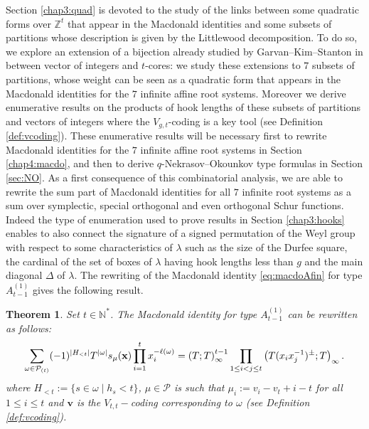 \documentclass[11pt,letterpaper]{amsart}
\def\bbbz{\mathbb Z}
\def\ccp{\mathcal P}
\newtheorem{thm}[df]{Theorem}
\numberwithin{equation}{section}
\numberwithin{df}{section}
\begin{document}
Section \ref{chap3:quad} is devoted to the study of the links between some quadratic forms over $\bbbz^t$ that appear in the Macdonald identities and some subsets of partitions whose description is given by the Littlewood decomposition. To do so, we explore an extension of a bijection already studied by Garvan--Kim--Stanton in \cite{GKS} between vector of integers and $t$-cores: we study these extensions to $7$ subsets of partitions, whose weight can be seen as a quadratic form that appears in the Macdonald identities for the $7$ infinite affine root systems. Moreover we derive enumerative results on the products of hook lengths of these subsets of partitions and vectors of integers where the $V_{g,t}$-coding is a key tool (see Definition \ref{def:vcoding}).
 These enumerative results will be necessary first to rewrite Macdonald identities for the $7$ infinite affine root systems in Section \ref{chap4:macdo}, and then to derive $q$-Nekrasov--Okounkov type formulas in Section \ref{sec:NO}. As a first consequence of this combinatorial analysis, we are able to rewrite the sum part of Macdonald identities for all $7$ infinite root systems as a sum over symplectic, special orthogonal and even orthogonal Schur functions. Indeed the type of enumeration used to prove results in Section \ref{chap3:hooks} enables to also connect the signature of a signed permutation of the Weyl group with respect to some characteristics of $\lambda$ such as the size of the Durfee square, the cardinal of the set of boxes of $\lambda$ having hook lengths less than $g$ and the main diagonal $\Delta$ of $\lambda$.
The rewriting of the Macdonald identity \eqref{eq:macdoAfin} for type $A^{(1)}_{t-1}$ gives the following result.
\begin{thm}\label{prop:MacdotypeA}
Set $t\in\mathbb{N}^*$. The Macdonald identity for type $A^{(1)}_{t-1}$ can be rewritten as follows:
\begin{equation}\label{eq:macdoa}
\sum_{\omega\in\ccp_{(t)}} (-1)^{\lvert H_{< t} \rvert}T^{\lvert\omega\rvert}  s_{\mu}({\bf x})\prod_{i=1}^t x_i^{-\ell(\omega)}
=\left(T;T\right)_\infty^{t-1}\prod_{1\le i<j\le t}\left(T(x_ix_j^{-1})^{\pm};T\right)_\infty.
\end{equation}
where $H_{< t}:=\lbrace s\in\omega\mid h_s<t\rbrace$, $\mu\in\ccp$ is such that $\mu_i:=v_i-v_t+i-t$ for all $1\leq i \leq t$ and $\mathbf{v}$ is the $V_{t,t}-$coding corresponding to $\omega$ (see Definition \ref{def:vcoding}).
\end{thm}
\end{document}
